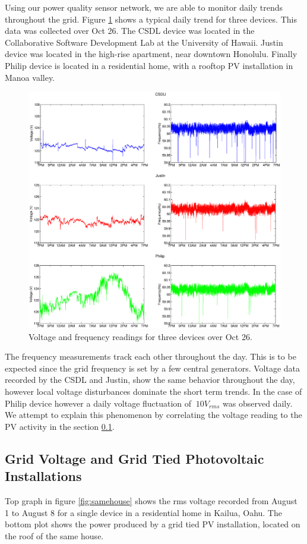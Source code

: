 Using our power quality sensor network, we are able to monitor daily trends throughout the grid. Figure \ref{fig:trends} shows a typical daily trend for three devices. This data was 
collected over Oct 26. The CSDL device was located in the Collaborative Software Development Lab at the University of Hawaii. Justin device was located in the high-rise apartment, near
downtown Honolulu. Finally Philip device is located in a residential home, with a rooftop PV installation in Manoa valley.

\newpage
\begin{figure}[h!]
\centering
\includegraphics[width=\textwidth]{img/1Day.eps}
\caption{Voltage and frequency readings for three devices over Oct 26.}
\label{fig:trends}
\end{figure}
\newpage

The frequency measurements track each other throughout the day. This is to be expected since the grid frequency is set by a few central generators. Voltage data recorded by the CSDL and  Justin, show the same behavior throughout the day, however local voltage disturbances dominate the short term trends. In the case of Philip device however a daily voltage fluctuation of $~10V_{rms}$ was observed daily. We attempt to explain this phenomenon by correlating the voltage reading to the PV activity in the section \ref{sub:PV}.

\subsection{Grid Voltage and Grid Tied Photovoltaic Installations}
\label{sub:PV}
Top graph in figure \ref{fig:samehouse} shows the rms voltage recorded from August 1 to August 8 for a single device in a residential home in Kailua, Oahu. The bottom plot shows the power produced by 
a grid tied PV installation, located on the roof of the same house.

